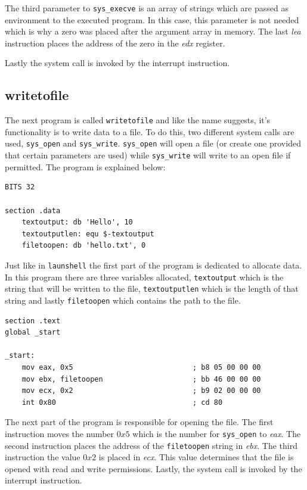 \documentclass[11pt,twoside]{eitExjobb}
\begin{document}
The third parameter to \texttt{sys\_execve} is an array of strings which are passed as environment to the executed program. In this case, this parameter is not needed which is why a zero was placed after the argument array in memory. The last \emph{lea} instruction places the address of the zero in the \emph{edx} register.

Lastly the system call is invoked by the interrupt instruction.



\subsection{writetofile}
The next program is called \texttt{writetofile} and like the name suggests, it's functionality is to write data to a file. To do this, two different system calls are used, \texttt{sys\_open} and \texttt{sys\_write}. \texttt{sys\_open} will open a file (or create one provided that certain parameters are used) while \texttt{sys\_write} will write to an open file if permitted. The program is explained below:

\begin{verbatim}
BITS 32

section .data
    textoutput: db 'Hello', 10
    textoutputlen: equ $-textoutput
    filetoopen: db 'hello.txt', 0
\end{verbatim}

\noindent Just like in \texttt{launshell} the first part of the program is dedicated to allocate data. In this program there are three variables allocated, \texttt{textoutput} which is the string that will be written to the file, \texttt{textoutputlen} which is the length of that string and lastly \texttt{filetoopen} which contains the path to the file.

\begin{verbatim}
section .text
global _start

_start:
    mov eax, 0x5                            ; b8 05 00 00 00
    mov ebx, filetoopen                     ; bb 46 00 00 00
    mov ecx, 0x2                            ; b9 02 00 00 00
    int 0x80                                ; cd 80
\end{verbatim}

\noindent The next part of the program is responsible for opening the file. The first instruction moves the number $0x5$ which is the number for \texttt{sys\_open} to \emph{eax}. The second instruction places the address of the \texttt{filetoopen} string in \emph{ebx}. The third instruction the value $0x2$ is placed in \emph{ecx}. This value determines that the file is opened with read and write permissions. Lastly, the system call is invoked by the interrupt instruction.
\end{document}
